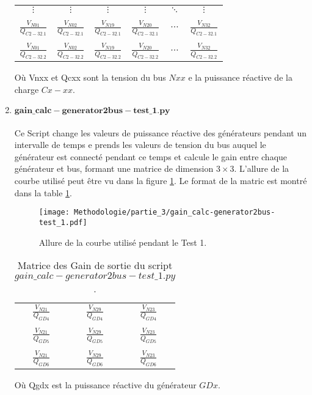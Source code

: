 \begin{enumerate}[\bfseries 4.3.1]
\begin{table}[H]
{\begin{tabular}{cccccc}
				$ \vdots $&$ \vdots $&$ \vdots $&$ \vdots $&$ \ddots $&$ \vdots $\\
				&&&&&\\
				$\frac{V_{N01}}{Q_{C 2-32.1}}$& $\frac{V_{N02}}{Q_{C 2-32.1}}$& $\frac{V_{N19}}{Q_{C 2-32.1}}$& $\frac{V_{N20}}{Q_{C 2-32.1}}$&$\cdots$&$\frac{V_{N32}}{Q_{C 2-32.1}}$\\
				&&&&&\\
				$\frac{V_{N01}}{Q_{C 2-32.2}}$& $\frac{V_{N02}}{Q_{C 2-32.2}}$& $\frac{V_{N19}}{Q_{C 2-32.2}}$& $\frac{V_{N20}}{Q_{C 2-32.2}}$&$\cdots$&$\frac{V_{N32}}{Q_{C 2-32.2}}$\\
		\end{tabular}}		
	\end{table}
	Où \gls{Vnxx}  et \gls{Qcxx} sont la tension du bus $ Nxx $ e la puissance réactive de la charge $ Cx-xx $.
	
	\item $\mathbf{gain\_calc-generator2bus-test\_1.py}$\\
	\\Ce Script change les valeurs de puissance réactive des générateurs pendant un intervalle de temps e prends les valeurs de tension du bus auquel le générateur est connecté pendant ce temps et calcule le gain entre chaque générateur et bus, formant une matrice de dimension $ 3\times3 $. L'allure de la courbe utilisé peut être vu dans la figure \ref{fig:gaincalcgenerator2bustest1}. Le format de la matric est montré dans la table \ref{tab:gaincalcgenerator2bustest1}.
	\begin{figure}[H]
		\begin{center}	
			\texttt{[image: Methodologie/partie\_3/gain\_calc-generator2bus-test\_1.pdf]}
			\caption{Allure de la courbe utilisé pendant le Test 1.}
			\label{fig:gaincalcgenerator2bustest1}
		\end{center}
	\end{figure}
\begin{table}[H]
	\captionsetup{justification=centering,margin=2cm}
	\caption{Matrice des Gain de sortie du script $gain\_calc-generator2bus-test\_1.py$.}
	\label{tab:gaincalcgenerator2bustest1}
	\centering
	\begin{tabular}{ccc}
		$ \frac{V_{N21}}{Q_{GD4}} $&$ \frac{V_{N29}}{Q_{GD4}} $&$ \frac{V_{N23}}{Q_{GD4}} $\\
		&&\\
		$ \frac{V_{N21}}{Q_{GD5}} $&$ \frac{V_{N29}}{Q_{GD5}} $&$ \frac{V_{N23}}{Q_{GD5}} $\\
		&&\\
		$ \frac{V_{N21}}{Q_{GD6}} $&$ \frac{V_{N29}}{Q_{GD6}} $&$ \frac{V_{N23}}{Q_{GD6}} $\\
	\end{tabular}
\end{table}
Où \gls{Qgdx} est la puissance réactive du générateur $ GDx $.


\end{enumerate}
